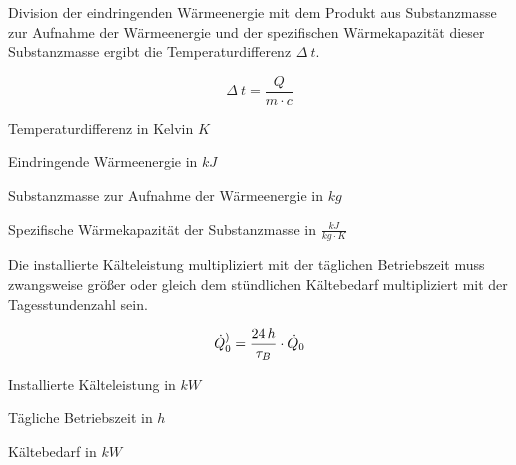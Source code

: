 Division der eindringenden Wärmeenergie mit dem Produkt aus Substanzmasse zur
Aufnahme der Wärmeenergie und der spezifischen Wärmekapazität dieser
Substanzmasse ergibt die Temperaturdifferenz $\Delta\:t$.

\begin{equation}
	\Delta\:t = \frac{Q}{m\cdot c}
\label{tdif}
\end{equation}

\begin{description}[\dth]

	\item[$\Delta\:t$] Temperaturdifferenz in Kelvin $K$
	\item[$Q$] Eindringende Wärmeenergie in $kJ$
	\item[$m$] Substanzmasse zur Aufnahme der Wärmeenergie in $kg$
	\item[$c$] Spezifische Wärmekapazität der Substanzmasse in $\frac{kJ}{kg
		\cdot K}$

\end{description}
\vspace{0.5cm}


Die installierte Kälteleistung multipliziert mit der täglichen Betriebszeit muss
zwangsweise größer oder gleich dem stündlichen Kältebedarf multipliziert mit der
Tagesstundenzahl sein.

\begin{equation}
	\pinstall = \frac{24\,h}{ \tau_{B} }  \cdot \pkalt \label{pinstall}
\end{equation}

\begin{description}[\dth]

	\item[$\pinstall$] Installierte Kälteleistung in $kW$
	\item[$\tau_{B}$] Tägliche Betriebszeit in $h$
	\item[$\pkalt$] Kältebedarf in $kW$

\end{description}
\vspace{0.5cm}


